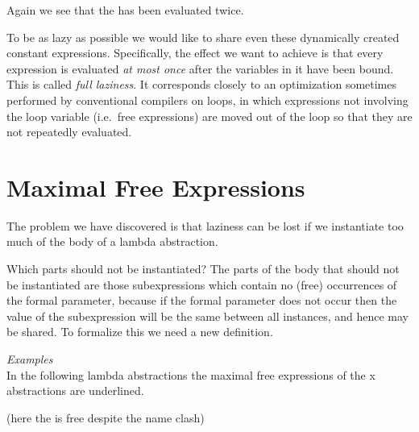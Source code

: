 \noindent
Again we see that the  has been evaluated twice.

To be as lazy as possible we would like to share even these dynamically
created constant expressions. Specifically, the effect we want to achieve is that
every expression is evaluated \textit{at most once} after the variables in it have been
bound. This is called \textit{full laziness}. It corresponds closely to an optimization
sometimes performed by conventional compilers on loops, in which
expressions not involving the loop variable (i.e.\ free expressions) are moved
out of the loop so that they are not repeatedly evaluated.

\section{Maximal Free Expressions}

The problem we have discovered is that laziness can be lost if we instantiate
too much of the body of a lambda abstraction.

Which parts should not be instantiated? The parts of the body that should
not be instantiated are those subexpressions which contain no (free)
occurrences of the formal parameter, because if the formal parameter does
not occur then the value of the subexpression will be the same between all
instances, and hence may be shared. To formalize this we need a new
definition.


\noindent
\textit{Examples}\\
In the following lambda abstractions the maximal free expressions of the \tl x
abstractions are underlined.
\vs

\begin{compactenum}[\quad(1)]
    \item {}
    \item {}
    \item {}
    \item {}
    \item {} (here the  is free despite the name clash)
\end{compactenum}
\vs

